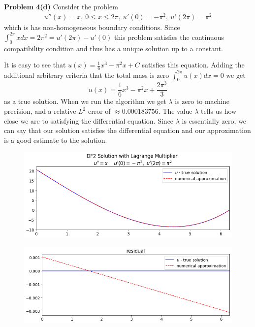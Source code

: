 \documentclass[12pt]{article}
\newcommand{\problem}[1]{\hspace{-4 ex} \large \textbf{Problem #1} }
\begin{document}
\bigbreak
\problem{4(d)} Consider the problem
\begin{align}
u''(x) = x, \ 0 \leq x \leq 2\pi, \ u'(0)=-\pi^2, \ u'(2\pi)=\pi^2 \label{original_ode}
\end{align}
which is has non-homogeneous boundary conditions. Since $\int_0^{2\pi}x dx = 2\pi^2 = u'(2\pi)-u'(0)$ this problem satisfies the continuous compatibility condition and thus has a unique solution up to a constant. 
\bigbreak

It is easy to see that $u(x) = \frac{1}{6}x^3 - \pi^2x + C$ satisfies this equation.
Adding the additional arbitrary criteria that the total mass is zero $\int_0^{2\pi} u(x) dx = 0$ we get
$$
u(x) = \frac{1}{6}x^3 - \pi^2x + \frac{2\pi^3}{3}
$$
as a true solution. When we run the algorithm we get $\lambda$ is zero to machine precision, and a relative $L^2$ error of $\approx 0.000183756$. The value $\lambda$ tells us how close we are to satisfying the differential equation. Since $\lambda$ is essentially zero, we can say that our solution satisfies the differential equation and our approximation is a good estimate to the solution.

\begin{figure}[H]
	\includegraphics[width=1\textwidth]{hw03_p4d}
	\centering
\end{figure}
\begin{figure}[H]
	\includegraphics[width=1\textwidth]{hw03_p4d_residual}
	\centering
\end{figure}
\end{document}
